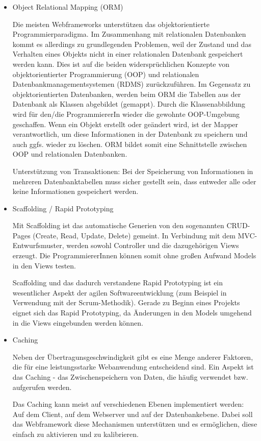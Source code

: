 \documentclass[abstracton, listof=totocnumbered,
bibliography=totocnumbered]{scrreprt}
\begin{document}
\begin{itemize}
  \item Object Relational Mapping (ORM)

Die meisten Webframeworks unterstützen das objektorientierte
Programmierparadigma. Im Zusammenhang mit relationalen Datenbanken kommt es
allerdings zu grundlegenden Problemen, weil der Zustand und das Verhalten eines
Objekts nicht in einer relationalen Datenbank gespeichert werden kann. Dies ist
auf die beiden widersprüchlichen Konzepte von objektorientierter Programmierung
(OOP) und relationalen Datenbankmanagementsystemen (RDMS) zurückzuführen. Im
Gegensatz zu objektorientierten Datenbanken, werden beim ORM die Tabellen aus
der Datenbank als Klassen abgebildet (gemappt). Durch die Klassenabbildung wird
für den/die ProgrammiererIn wieder die gewohnte OOP-Umgebung geschaffen. Wenn
ein Objekt erstellt oder geändert wird, ist der Mapper verantwortlich, um diese
Informationen in der Datenbank zu speichern und auch ggfs. wieder zu löschen.
ORM bildet somit eine Schnittstelle zwischen OOP und relationalen Datenbanken.

Unterstützung von Transaktionen: Bei der Speicherung von Informationen in
mehreren Datenbanktabellen muss sicher gestellt sein, dass entweder alle oder
keine Informationen gespeichert werden.

  \item Scaffolding / Rapid Prototyping

Mit Scaffolding ist das automatische Generien von den sogenannten CRUD-Pages
(Create, Read, Update, Delete) gemeint. In Verbindung mit dem
MVC-Entwurfsmuster, werden sowohl Controller und die dazugehörigen Views
erzeugt. Die ProgrammiererInnen können somit ohne großen Aufwand Models in den
Views testen.

Scaffolding und das dadurch verstandene Rapid Prototyping ist ein wesentlicher
Aspekt der agilen Softwareentwicklung (zum Beispiel in Verwendung mit der
Scrum-Methodik). Gerade zu Beginn eines Projekts eignet sich das Rapid
Prototyping, da Änderungen in den Models umgehend in die Views eingebunden
werden können.

  \item Caching

Neben der Übertragunsgeschwindigkeit gibt es eine Menge anderer Faktoren, die
für eine leistungsstarke Webanwendung entscheidend sind. Ein Aspekt ist das
Caching - das Zwischenspeichern von Daten, die häufig verwendet bzw. aufgerufen
werden.

Das Caching kann meist auf verschiedenen Ebenen implementiert werden: Auf dem
Client, auf dem Webserver und auf der Datenbankebene. Dabei soll das
Webframework diese Mechanismen unterstützen und es ermöglichen, diese einfach
zu aktivieren und zu kalibrieren.  


\end{itemize}
\end{document}
